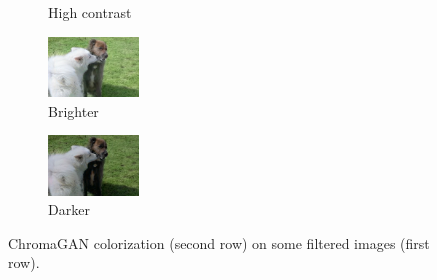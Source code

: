 \begin{figure}[ht]
\begin{subfigure}[b]{0.1\textwidth}
			\caption{High contrast}
		\end{subfigure}
		\hfill
		\begin{subfigure}[b]{0.1\textwidth}
			\includegraphics[width=2.4cm]{c - filter - lumin (1).jpeg}
			\caption{Brighter}
		\end{subfigure}
		\hfill
		\begin{subfigure}[b]{0.1\textwidth}
			\includegraphics[width=2.4cm]{c - filter - lumin (2).jpeg}
			\caption{Darker}
		\end{subfigure}
	\caption{{\small ChromaGAN colorization (second row) on some filtered images (first row).}}
	\label{fig:filter}
\end{figure}